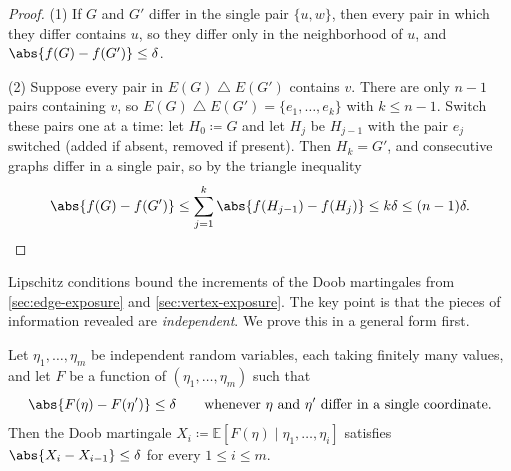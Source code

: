 \begin{proof}
    (1) If \(G\) and \(G'\) differ in the single pair \(\{u, w\}\), then every pair in which they differ contains \(u\), so they differ only in the neighborhood of \(u\), and \(\abs{f(G) - f(G')} \le \delta\).

    (2) Suppose every pair in \(E(G) \mathbin{\triangle} E(G')\) contains \(v\). There are only \(n - 1\) pairs containing \(v\), so \(E(G) \mathbin{\triangle} E(G') = \{e_{1}, \ldots, e_{k}\}\) with \(k \le n - 1\). Switch these pairs one at a time: let \(H_{0} \coloneqq G\) and let \(H_{j}\) be \(H_{j-1}\) with the pair \(e_{j}\) switched (added if absent, removed if present). Then \(H_{k} = G'\), and consecutive graphs differ in a single pair, so by the triangle inequality
    \[
        \abs{f(G) - f(G')} \le \sum_{j=1}^{k} \abs{f(H_{j-1}) - f(H_{j})} \le k\delta \le (n-1)\delta . \qedhere
    \]
\end{proof}

Lipschitz conditions bound the increments of the Doob martingales from \autoref{sec:edge-exposure} and \autoref{sec:vertex-exposure}. The key point is that the pieces of information revealed are \emph{independent}. We prove this in a general form first.

\begin{lemma}\label{lem:bounded-differences}
    Let \(\eta_{1}, \ldots, \eta_{m}\) be independent random variables, each taking finitely many values, and let \(F\) be a function of \((\eta_{1}, \ldots, \eta_{m})\) such that
    \[
        \abs{F(\eta) - F(\eta')} \le \delta \qquad \text{whenever } \eta \text{ and } \eta' \text{ differ in a single coordinate}.
    \]
    Then the Doob martingale \(X_{i} \coloneqq \mathbb{E}[F(\eta) \mid \eta_{1}, \ldots, \eta_{i}]\) satisfies \(\abs{X_{i} - X_{i-1}} \le \delta\) for every \(1 \le i \le m\).
\end{lemma}


